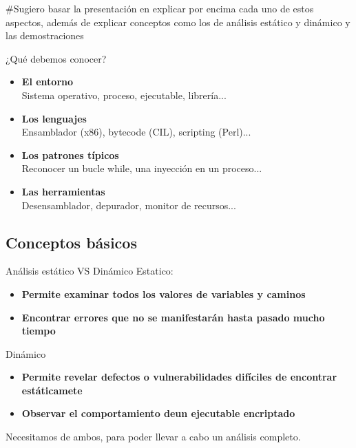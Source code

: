 \documentclass{beamer}
\begin{document}
#Sugiero basar la presentación en explicar por encima cada uno de estos aspectos, además de explicar conceptos como los de análisis estático y dinámico y las demostraciones
\begin{frame}{¿Qué debemos conocer?}
\begin{itemize}
\item \textbf{El entorno} \\ \hspace{4ex}Sistema operativo, proceso, ejecutable, librería...
\item \textbf{Los lenguajes} \\ \hspace{4ex}Ensamblador (x86), bytecode (CIL), scripting (Perl)...
\item \textbf{Los patrones típicos} \\ \hspace{4ex}Reconocer un bucle while, una inyección en un proceso...
\item \textbf{Las herramientas} \\ \hspace{4ex}Desensamblador, depurador, monitor de recursos...
\end{itemize}

\end{frame}



\subsection{Conceptos básicos}

\begin{frame}{Análisis estático VS Dinámico}
Estatico:
\begin{itemize}
	\item \textbf{Permite examinar todos los valores de variables y caminos}
	\item \textbf{Encontrar errores que no se manifestarán hasta pasado mucho tiempo}
\end{itemize}
Dinámico
\begin{itemize}
	\item \textbf{Permite revelar defectos o vulnerabilidades difíciles de encontrar estáticamete}
	\item \textbf{Observar el comportamiento deun ejecutable encriptado}
\end{itemize}
Necesitamos de ambos, para poder llevar a cabo un análisis completo.


\end{frame}
\end{document}
